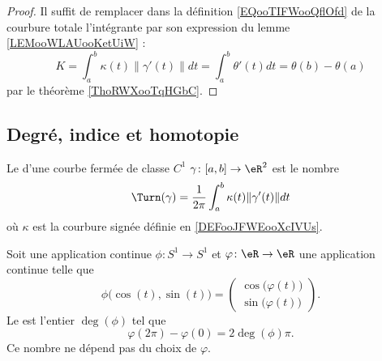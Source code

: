 \begin{proof}
    Il suffit de remplacer dans la définition \eqref{EQooTIFWooQflOfd} de la courbure totale l'intégrante par son expression 
    du lemme \ref{LEMooWLAUooKetUiW} : 
    \begin{equation}
        K=\int_a^b\kappa(t)\| \gamma'(t) \|dt=\int_a^b\theta'(t)dt=\theta(b)-\theta(a)
    \end{equation}
    par le théorème \ref{ThoRWXooTqHGbC}.
\end{proof}

\subsection{Degré, indice et homotopie}

\begin{definition}
    Le  d'une courbe fermée de classe \( C^1\) \( \gamma\colon \mathopen[ a , b \mathclose]\to \eR^2\) est le nombre
    \begin{equation}
        \Turn(\gamma)=\frac{1}{ 2\pi }\int_a^b\kappa(t)\| \gamma'(t) \|dt
    \end{equation}
    où \( \kappa\) est la courbure signée définie en \ref{DEFooJFWEooXcIVUs}.
\end{definition}

\begin{lemmaDef}        \label{DEFooTKBUooNVcheO}
    Soit une application continue \( \phi\colon S^1\to S^1\) et \( \varphi\colon \eR\to \eR\) une application continue telle que
    \begin{equation}
        \phi\big( \cos(t),\sin(t) \big)=\begin{pmatrix}
            \cos\big( \varphi(t) \big)    \\ 
            \sin\big( \varphi(t) \big)    
        \end{pmatrix}.
    \end{equation}
    Le  est l'entier \( \deg(\phi)\) tel que
    \begin{equation}
        \varphi(2\pi)-\varphi(0)=2\deg(\phi)\pi.
    \end{equation}
    Ce nombre ne dépend pas du choix de \( \varphi\).
\end{lemmaDef}

